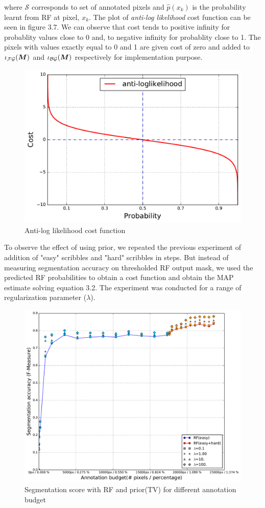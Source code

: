 where $\mathcal{S}$ corresponds to set of annotated pixels and $\widehat{p}(x_{k})$ is the probability learnt from RF at pixel, $x_k$. The plot of \textit{anti-log likelihood} cost function can be seen in figure 3.7. We can observe that cost tends to positive infinity for probablity values close to 0 and, to negative infinity for probablity close to 1. The pixels with values exactly equal to 0 and 1 are given cost of zero and added to $\iota_{\mathcal{FG}}(\boldsymbol{M})$ and $\iota_{\mathcal{BG}}(\boldsymbol{M})$ respectively for implementation purpose.

\begin{figure}[h!] \label{fig:nll}
\centering
 \includegraphics[width=0.75\linewidth]{figures/nll_func.pdf}
\caption{Anti-log likelihood cost function}
\end{figure}

To observe the effect of using prior, we repeated the previous experiment of addition of "easy" scribbles and "hard" scribbles in steps. But instead of measuring segmentation accuracy on thresholded RF output mask, we used the predicted RF probabilities to obtain a cost function and obtain the MAP estimate solving equation 3.2. The experiment was conducted for a range of regularization parameter ($\lambda$).


\begin{figure}[h!] \label{fig:rf_vip}
\centering
 \includegraphics[width=0.75\linewidth]{figures/rf_vip_easy_hard_full.pdf}
\caption{Segmentation score with RF and prior(TV) for different annotation budget}
\end{figure}

